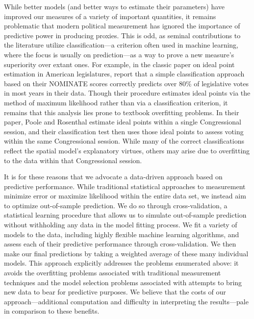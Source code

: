 While better models (and better ways to estimate their parameters) have improved our measures of a variety of important quantities, it remains problematic that modern political measurement has ignored the importance of predictive power in producing proxies.
This is odd, as seminal contributions to the literature utilize classification---a criterion often used in machine learning, where the focus is usually on prediction---as a way to prove a new measure's superiority over extant ones. For example, in the classic paper on ideal point estimation in American legislatures, \citet[Table 3]{poole1985} report that a simple classification approach based on their NOMINATE scores correctly predicts over 80\% of legislative votes in most years in their data. Though their procedure estimates ideal points via the method of maximum likelihood rather than via a classification criterion, it remains that this analysis lies prone to textbook overfitting problems.
In their paper, Poole and Rosenthal estimate ideal points within a single Congressional session, and their classification test then uses those ideal points to assess voting within the same Congressional session.
While many of the correct classifications reflect the spatial model's explanatory virtues, others may arise due to overfitting to the data within that Congressional session.

It is for these reasons that we advocate a data-driven approach based on predictive performance.  While traditional statistical approaches to measurement minimize error or maximize likelihood within the entire data set, we instead aim to optimize out-of-sample prediction.
We do so through cross-validation, a statistical learning procedure that allows us to simulate out-of-sample prediction without withholding any data in the model fitting process.
We fit a variety of models to the data, including highly flexible machine learning algorithms, and assess each of their predictive performance through cross-validation.
We then make our final predictions by taking a weighted average of these many individual models.
This approach explicitly addresses the problems enumerated above: it avoids the overfitting problems associated with traditional measurement techniques and the model selection problems associated with attempts to bring new data to bear for predictive purposes.
We believe that the costs of our approach---additional computation and difficulty in interpreting the results---pale in comparison to these benefits.

